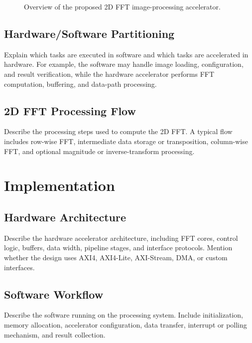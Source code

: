 \documentclass[conference]{IEEEtran}
\begin{document}
\begin{figure}[htbp]
    \centering
    \caption{Overview of the proposed 2D FFT image-processing accelerator.}
    \label{fig:system-overview}
\end{figure}

\subsection{Hardware/Software Partitioning}
Explain which tasks are executed in software and which tasks are accelerated in hardware. For example, the software may handle image loading, configuration, and result verification, while the hardware accelerator performs FFT computation, buffering, and data-path processing.

\subsection{2D FFT Processing Flow}
Describe the processing steps used to compute the 2D FFT. A typical flow includes row-wise FFT, intermediate data storage or transposition, column-wise FFT, and optional magnitude or inverse-transform processing.

\section{Implementation}\label{sec:implementation}
\subsection{Hardware Architecture}
Describe the hardware accelerator architecture, including FFT cores, control logic, buffers, data width, pipeline stages, and interface protocols. Mention whether the design uses AXI4, AXI4-Lite, AXI-Stream, DMA, or custom interfaces.

\subsection{Software Workflow}
Describe the software running on the processing system. Include initialization, memory allocation, accelerator configuration, data transfer, interrupt or polling mechanism, and result collection.
\end{document}
